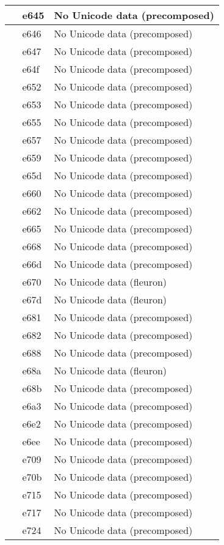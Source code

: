 \documentclass[12pt,letterpaper,openany]{book}
\begin{document}
\begin{center}
\begin{supertabular}{|m{0.25in}|m{0.5in}|m{4in}|}
 & e645 & No Unicode data (precomposed)\\\hline
 & e646 & No Unicode data (precomposed)\\\hline
 & e647 & No Unicode data (precomposed)\\\hline
 & e64f & No Unicode data (precomposed)\\\hline
 & e652 & No Unicode data (precomposed)\\\hline
 & e653 & No Unicode data (precomposed)\\\hline
 & e655 & No Unicode data (precomposed)\\\hline
 & e657 & No Unicode data (precomposed)\\\hline
 & e659 & No Unicode data (precomposed)\\\hline
 & e65d & No Unicode data (precomposed)\\\hline
 & e660 & No Unicode data (precomposed)\\\hline
 & e662 & No Unicode data (precomposed)\\\hline
 & e665 & No Unicode data (precomposed)\\\hline
 & e668 & No Unicode data (precomposed)\\\hline
 & e66d & No Unicode data (precomposed)\\\hline
 & e670 & No Unicode data (fleuron)\\\hline
 & e67d & No Unicode data (fleuron)\\\hline
 & e681 & No Unicode data (precomposed)\\\hline
 & e682 & No Unicode data (precomposed)\\\hline
 & e688 & No Unicode data (precomposed)\\\hline
 & e68a & No Unicode data (fleuron)\\\hline
 & e68b & No Unicode data (precomposed)\\\hline
 & e6a3 & No Unicode data (precomposed)\\\hline
 & e6e2 & No Unicode data (precomposed)\\\hline
 & e6ee & No Unicode data (precomposed)\\\hline
 & e709 & No Unicode data (precomposed)\\\hline
 & e70b & No Unicode data (precomposed)\\\hline
 & e715 & No Unicode data (precomposed)\\\hline
 & e717 & No Unicode data (precomposed)\\\hline
 & e724 & No Unicode data (precomposed)\\\hline

\end{supertabular}
\end{center}
\end{document}
